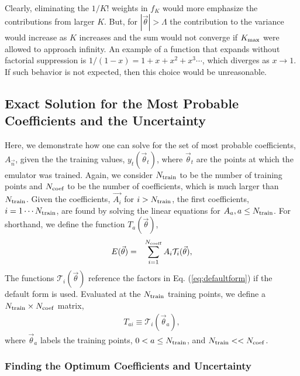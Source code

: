\documentclass[UserManual.tex]{subfiles}
\begin{document}
\\
Clearly, eliminating the $1/K!$ weights in $f_K$ would more emphasize the contributions from larger $K$. But, for $|\vec{\theta}|>\Lambda$ the contribution to the variance would increase as $K$ increases and the sum would not converge if $K_{\rm max}$ were allowed to approach infinity. An example of a function that expands without factorial suppression is $1/(1-x)=1+x+x^2+x^3\cdots$, which diverges as $x\rightarrow 1$. If such behavior is not expected, then this choice would be unreasonable.

\subsection{Exact Solution for the Most Probable Coefficients and the Uncertainty}

Here, we demonstrate how one can solve for the set of most probable coefficients, $A_{\vec{n}}$, given the the training values, $y_t(\vec{\theta}_t)$, where $\vec{\theta}_t$ are the points at which the emulator was trained. Again, we consider $N_{\rm train}$ to be the number of training points and $N_{\rm coef}$ to be the number of coefficients, which is much larger than $N_{\rm train}$. Given the coefficients, $\vec{A_i}$ for $i>N_{\rm train}$, the first coefficients, $i=1\cdots N_{\rm train}$, are found by solving the linear equations for $A_a, a\le N_{\rm train}$. For shorthand, we define the function $T_a(\vec{\theta})$,
\begin{eqnarray}
E(\vec{\theta})&=&\sum_{i=1}^{N_{\rm coeff}}A_i\mathcal{T}_i(\vec{\theta}),
\end{eqnarray}
The functions $\mathcal{T}_i(\vec{\theta})$ reference the factors in Eq. (\ref{eq:defaultform}) if the default form is used. Evaluated at the $N_{\rm train}$ training points, we define a $N_{\rm train}\times N_{\rm coef}$ matrix,
\begin{eqnarray}
T_{ai}\equiv\mathcal{T}_i(\vec{\theta}_a),
\end{eqnarray}
where $\vec{\theta}_a$ labels the training points, $0< a\le N_{\rm train}$, and $N_{\rm train}<<N_{\rm coef}$. 

\subsubsection{Finding the Optimum Coefficients and Uncertainty}
\end{document}
